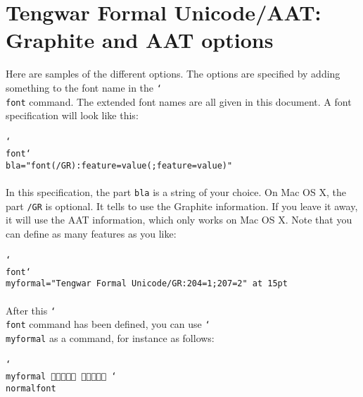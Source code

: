 \documentclass[11pt,a4paper]{article}
\begin{document}
\section{Tengwar Formal Unicode/AAT: Graphite and AAT options}

Here are samples of the different options. The options are specified by adding something to the font name in the \texttt{\char`\\font} command. The extended font names are all given in this document. A font specification will look like this:

\paragraph{} \texttt{\char`\\font\char`\\bla="font(/GR):feature=value(;feature=value)"}

\paragraph{} In this specification, the part \texttt{bla} is a string of your choice. On Mac OS X, the part \texttt{/GR} is optional. It tells \XeTeX{} to use the Graphite information. If you leave it away, it will use the AAT information, which only works on Mac OS X. Note that you can define as many features as you like:

\paragraph{} \texttt{\char`\\font\char`\\myformal="Tengwar Formal Unicode/GR:204=1;207=2" at 15pt}

\paragraph{} After this \texttt{\char`\\font} command has been defined, you can use \texttt{\char`\\myformal} as a command, for instance as follows:

\paragraph{} \texttt{\char`\\myformal   \char`\\normalfont}
\end{document}
